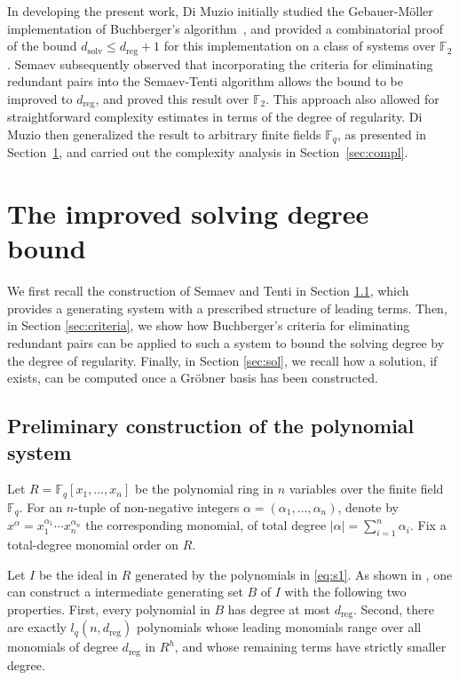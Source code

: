 \documentclass[a4paper, 12pt, oneside, openright]{article}
\begin{document}
In developing the present work, Di Muzio initially studied the Gebauer-M\"oller implementation of Buchberger's algorithm~\cite{GM}, and provided a combinatorial proof of the bound $d_{\mathrm{solv}}\le d_{\mathrm{reg}}+1$ for this implementation on a class of systems over $\mathbb F_2$.
Semaev subsequently observed that incorporating the criteria for eliminating redundant pairs into the Semaev-Tenti algorithm allows the bound to be improved to $d_{\mathrm{reg}}$, and proved this result over $\mathbb F_2$.
This approach also allowed for straightforward complexity estimates in terms of the degree of regularity.
Di Muzio then generalized the result to arbitrary finite fields $\mathbb F_q$, as presented in Section~\ref{sec:solvD}, and carried out the complexity analysis in Section~\ref{sec:compl}.

\section{The improved solving degree bound}\label{sec:solvD}
We first recall the construction of Semaev and Tenti in Section \ref{sec:ST}, which provides a generating system with a prescribed structure of leading terms.
Then,  in Section \ref{sec:criteria}, we show how Buchberger's criteria for eliminating redundant pairs can be applied to such a system to bound the solving degree by the degree of regularity.
Finally, in Section \ref{sec:sol}, we recall how a solution, if exists, can be computed once a Gr\"obner basis has been constructed.

\subsection{Preliminary construction of the polynomial system}\label{sec:ST}
Let $R=\mathbb F_q[x_1,\dots,x_n]$ be the polynomial ring in $n$ variables over the finite field $\mathbb F_q$.
For an $n$-tuple of non-negative integers $\alpha=(\alpha_1,\dots,\alpha_n)$, denote by $x^\alpha=x_1^{\alpha_1}\cdots x_n^{\alpha_n}$ the corresponding monomial, of total degree $|\alpha|=\sum_{i=1}^n\alpha_i$.
Fix a total-degree monomial order on $R$.


Let $I$ be the ideal in $R$ generated by the polynomials in \eqref{eq:s1}.
As shown in \cite{ST}, one can construct a intermediate generating set $B$ of $I$ with the following two properties.
First, every polynomial in $B$ has degree at most $d_{\mathrm{reg}}$. 
Second, there are exactly $l_q(n,d_{\mathrm{reg}})$ polynomials whose leading monomials range over all monomials of degree $d_{\mathrm{reg}}$ in $R^h$, and whose remaining terms have strictly smaller degree.
\end{document}
